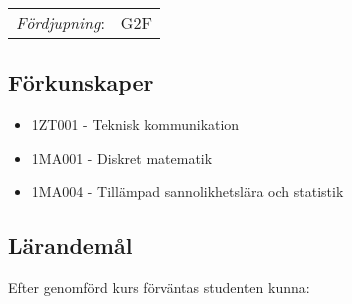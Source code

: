 \begin{tabular}{ll}\emph{Fördjupning}: & G2F\tabularnewline\end{tabular}

\subsection*{Förkunskaper}

\begin{itemize}
\tightlist
\item
  1ZT001 - Teknisk kommunikation
\item
  1MA001 - Diskret matematik
\item
  1MA004 - Tillämpad sannolikhetslära och statistik
\end{itemize}

\subsection*{Lärandemål}

Efter genomförd kurs förväntas studenten kunna:

